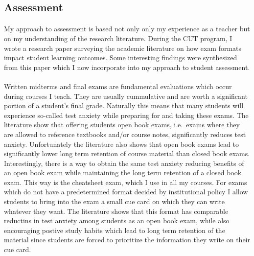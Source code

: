 \documentclass{article}
\begin{document}
\subsection{Assessment}
\paragraph{}
My approach to assessment is based not only only my experience as a teacher but on my understanding of the research literature. During the CUT program, I wrote a research paper surveying the academic literature on how exam formats impact student learning outcomes. Some interesting findings were synthesized from this paper which I now incorporate into my approach to student assessment.
\paragraph{}
Written midterms and final exams are fundamental evaluations which occur during courses I teach. They are usually cummulative and are worth a significant portion of a student's final grade. Naturally this means that many students will experience so-called test anxiety while preparing for and taking these exams. The literature show that offering students open book exams, i.e.\ exams where they are allowed to reference textbooks and/or course notes, significantly reduces test anxiety. Unfortunately the literature also shows that open book exams lead to significantly lower long term retention of course material than closed book exams. Interestingly, there is a way to obtain the same test anxiety reducing benefits of an open book exam while maintaining the long term retention of a closed book exam. This way is the cheatsheet exam, which I use in all my courses. For exams which do not have a predetermined format decided by institutional policy I allow students to bring into the exam a small cue card on which they can write whatever they want. The literature shows that this format has comparable reductins in test anxiety among students as an open book exam, while also encouraging postive study habits which lead to long term retention of the material since students are forced to prioritize the information they write on their cue card.
\end{document}

